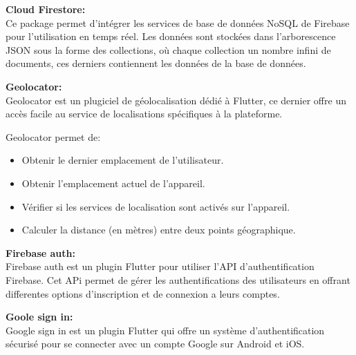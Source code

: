 \textbf{Cloud Firestore:}\\
Ce package permet d'intégrer les services de base de données NoSQL de Firebase pour l'utilisation en temps réel. Les données sont stockées dans l'arborescence JSON sous la forme des collections, où chaque collection un nombre infini de documents, ces derniers contiennent les données de la base de données.\bigskip

\textbf{Geolocator: }\\
Geolocator est un plugiciel de géolocalisation dédié à Flutter, ce dernier offre un accès facile au service de localisations spécifiques à la plateforme.\bigskip

Geolocator permet de: 
\begin{itemize}
    \item Obtenir le dernier emplacement de l'utilisateur.
    \item Obtenir l'emplacement actuel de l'appareil.
    \item Vérifier si les services de localisation sont activés sur l'appareil.
    \item Calculer la distance (en mètres) entre deux points géographique.
\end{itemize}
\bigskip

\textbf{Firebase auth:}\\
Firebase auth est un plugin Flutter pour utiliser l'API d'authentification Firebase. Cet APi permet de gérer les authentifications des utilisateurs en offrant differentes options d'inscription et de connexion a leurs comptes.\bigskip

\textbf{Goole sign in:}\\
Google sign in est un plugin Flutter qui offre un système d'authentification sécurisé pour se connecter avec un compte Google sur Android et iOS.\bigskip